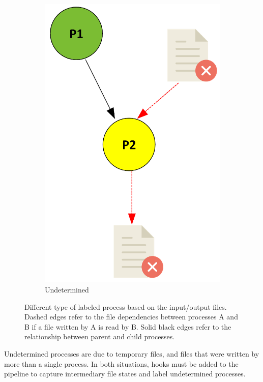 \documentclass[a4paper,num-refs]{oup-contemporary}
\begin{document}
\begin{figure}
\begin{subfigure}{0.2\linewidth}
    \includegraphics[scale=0.3]{images/yellow.png}
    \caption{Undetermined}
    \label{fig:yellow}
\end{subfigure}
    \caption{Different type of labeled process based on the input/output files.
  Dashed edges refer to the file dependencies between processes A and B 
  if a file written by A is read by B. Solid black edges refer to the 
  relationship between parent and child processes.}
    \label{fig:processes}
\end{figure}

Undetermined processes are due to temporary files, and files that were
written by more than a single process. In both situations, hooks must
be added to the pipeline to capture intermediary file states and label
undetermined processes.
\end{document}
